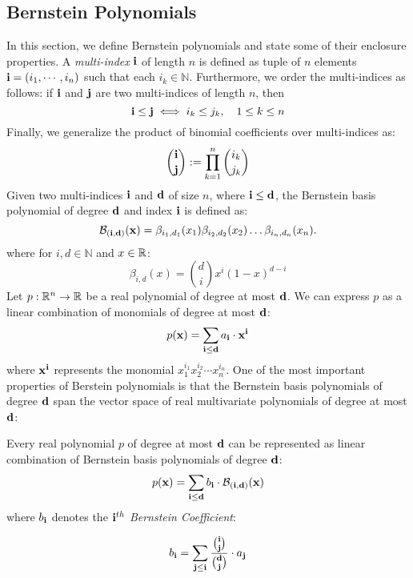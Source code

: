 \subsection{Bernstein Polynomials}
\label{sec:bernstein}
In this section, we define Bernstein polynomials and state some of their enclosure properties. A \emph{multi-index} ${\bf i}$ of length $n$ is defined as tuple of $n$ elements ${\bf i} = (i_1,\cdots, i_n)$ such that each $i_k \in \mathbb{N}$. Furthermore, we order the multi-indices as follows: if ${\bf i}$ and ${\bf j}$ are two multi-indices of length $n$, then
\[
  {\bf i} \leq {\bf j} \iff i_k \leq j_k, \quad 1 \leq  k \leq n
\]
Finally, we generalize the product of binomial coefficients over multi-indices as:
\[
  \binom{{\bf i}}{{\bf j}} := \prod_{k=1}^n \binom{i_k}{j_k}
\]
%
Given two multi-indices ${\bf i}$ and ${\bf d}$ of size $n$, where ${\bf i} \leq {\bf d}$, the Bernstein basis polynomial of degree ${\bf d}$ and index ${\bf i}$ is defined as:
\begin{equation}
\label{eq:bernstein_basis_poly}
\mathcal{B}_{({\bf i},{\bf d})}({\bf x}) = \beta_{i_1,d_1}(x_1) \beta_{i_2,d_2}(x_2)\ldots \beta_{i_n,d_n}(x_n).
\end{equation}
%
where for $i,d \in \mathbb{N}$ and $x \in {\mathbb{R}}$:
%
\begin{equation}
\beta_{i,d}(x) = \binom{d}{i}x^{i}(1-x)^{d - i}
\end{equation}
%
Let $p: {\mathbb{R}}^n \rightarrow {\mathbb{R}}$ be a real polynomial of degree at most ${\bf d}$. We can express $p$ as a linear combination of monomials of degree at most ${\bf d}$:
\[
p({\bf x}) = \sum_{{\bf i} \leq {\bf d}} a_{\bf i} \cdot {\bf x}^{\bf i}
\]
where ${\bf x}^{\bf i}$ represents the monomial $x_1^{i_1}x_2^{i_2}\cdots x_n^{i_n}$. One of the most important properties of Berstein polynomials is that the Bernstein basis polynomials of degree ${\bf d}$ span the vector space of real multivariate polynomials of degree at most ${\bf d}$:

\begin{property}
\label{prop:bern_basis}
Every real polynomial $p$ of degree at most ${\bf d}$ can be represented as linear combination of Bernstein basis polynomials of degree ${\bf d}$:
%
\begin{equation}
  \label{eq:bernstein_coeff}
  p({\bf x}) = \sum_{{\bf i} \leq {\bf d}} b_{{\bf i}} \cdot \mathcal{B}_{({\bf i},{\bf d})}({\bf x})
\end{equation}
where $b_{\bf i}$ denotes the \emph{${\bf i}^{th}$ Bernstein Coefficient}:

\begin{equation}
b_{{\bf i}} = \sum_{{\bf j} \leq {\bf i}} \frac{\binom{{\bf i}}{{\bf j}}}{\binom{{\bf d}}{{\bf j}}}\cdot a_{{\bf j}}
\end{equation}
\end{property}

